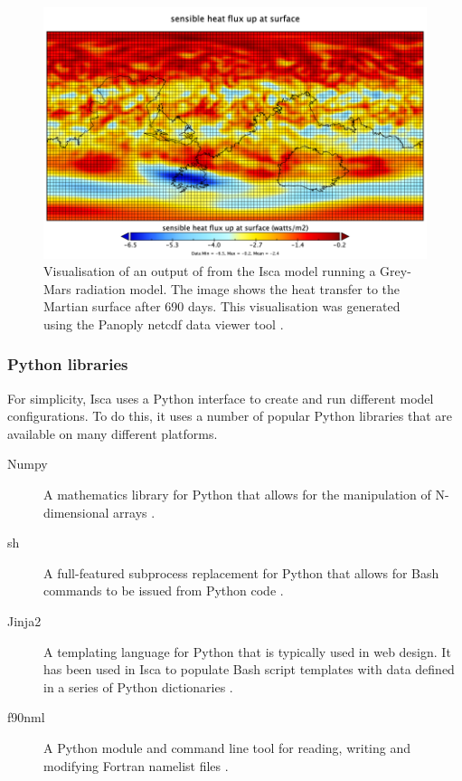 \documentclass[a4paper,11pt]{report}
\begin{document}
\begin{figure}[htbp]
\begin{center}
\includegraphics[width=\textwidth]{img/flux_t_in_atmos_daily.png}
\caption[Visual output from the Isca model]{Visualisation of an output of from the Isca model running a Grey-Mars radiation model. The image shows the heat transfer to the Martian surface after 690 days. This visualisation was generated using the Panoply \gls{netcdf} data viewer tool \cite{schmunk2015panoply}.}
\label{fig:netcdf}
\end{center}
\end{figure}

\subsubsection{Python libraries}
For simplicity, Isca uses a Python interface to create and run different model configurations. To do this, it uses a number of popular Python libraries that are available on many different platforms.

\begin{description}
	\item[Numpy] A mathematics library for Python that allows for the manipulation of N-dimensional arrays \cite{van2011numpy}.
	
	\item[sh] A full-featured subprocess replacement for Python that allows for Bash commands to be issued from Python code \cite{moffat2017sh}. 
	
	\item[Jinja2] A templating language for Python that is typically used in web design. It has been used in Isca to populate Bash script templates with data defined in a series of Python dictionaries \cite{ronacher2008jinja2}. 
	
	\item[f90nml] A Python module and command line tool for reading, writing and modifying Fortran namelist files \cite{wardf90nml}. 
	
\end{description}
\end{document}
